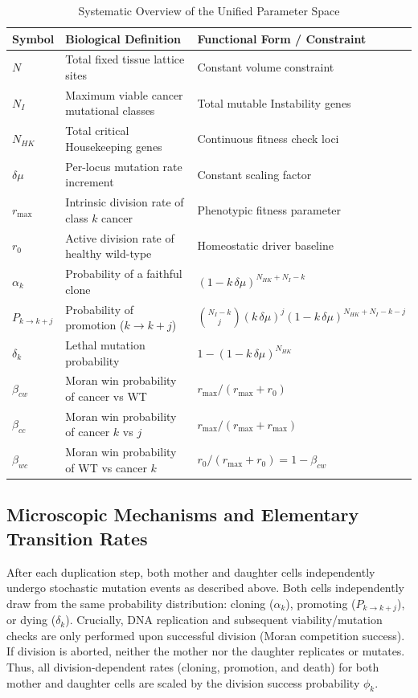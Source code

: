 \documentclass[11pt,a4paper]{article}
\begin{document}
\begin{table}[htbp]
\centering
\caption{Systematic Overview of the Unified Parameter Space}
\label{tab:parameters}
\begin{tabular}{lll}
\toprule
\textbf{Symbol} & \textbf{Biological Definition} & \textbf{Functional Form / Constraint} \\
\midrule
$N$ & Total fixed tissue lattice sites & Constant volume constraint \\
$N_I$ & Maximum viable cancer mutational classes & Total mutable Instability genes \\
$N_{HK}$ & Total critical Housekeeping genes & Continuous fitness check loci \\
$\delta\mu$ & Per-locus mutation rate increment & Constant scaling factor \\
$r_{\text{max}}$ & Intrinsic division rate of class $k$ cancer & Phenotypic fitness parameter \\
$r_0$ & Active division rate of healthy wild-type & Homeostatic driver baseline \\
$\alpha_k$ & Probability of a faithful clone & $(1-k\,\delta\mu)^{N_{HK} + N_I - k}$ \\
$P_{k \to k+j}$ & Probability of promotion ($k \to k+j$) & $\binom{N_I-k}{j}(k\,\delta\mu)^j(1-k\,\delta\mu)^{N_{HK}+N_I-k-j}$ \\
$\delta_k$ & Lethal mutation probability & $1 - (1-k\,\delta\mu)^{N_{HK}}$ \\
$\beta_{cw}$ & Moran win probability of cancer vs WT & $r_{\text{max}} / (r_{\text{max}} + r_0)$ \\
$\beta_{cc}$ & Moran win probability of cancer $k$ vs $j$ & $r_{\text{max}} / (r_{\text{max}} + r_{\text{max}})$ \\
$\beta_{wc}$ & Moran win probability of WT vs cancer $k$ & $r_0 / (r_{\text{max}} + r_0) = 1 - \beta_{cw}$ \\
\bottomrule
\end{tabular}
\end{table}

\subsection{Microscopic Mechanisms and Elementary Transition Rates}

After each duplication step, both mother and daughter cells independently undergo stochastic mutation events as described above. Both cells independently draw from the same probability distribution: cloning ($\alpha_k$), promoting ($P_{k \to k+j}$), or dying ($\delta_k$). Crucially, DNA replication and subsequent viability/mutation checks are only performed upon successful division (Moran competition success). If division is aborted, neither the mother nor the daughter replicates or mutates. Thus, all division-dependent rates (cloning, promotion, and death) for both mother and daughter cells are scaled by the division success probability $\phi_k$.
\end{document}
